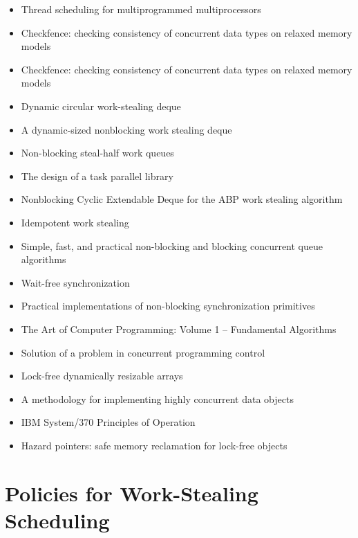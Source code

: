 \begin{itemize}
\item[\checkmark] Thread scheduling for multiprogrammed
  multiprocessors \cite{Arora2001}
\item[\texttimes] Checkfence: checking consistency of concurrent data
  types on relaxed memory models \cite{Burckhardt2007}
\item[\texttimes] Checkfence: checking consistency of concurrent data
  types on relaxed memory models \cite{Burckhardt2007a}
\item[\checkmark] Dynamic circular work-stealing deque
  \cite{Chase2005}
\item[\checkmark] A dynamic-sized nonblocking work stealing deque
  \cite{Hendler2006}
\item[\textbullet] Non-blocking steal-half work queues
  \cite{Hendler2002}
\item[\checkmark] The design of a task parallel library
  \cite{Leijen2009}
\item[\checkmark] Nonblocking Cyclic Extendable Deque for the ABP work
  stealing algorithm \cite{Lev2005}
\item[\checkmark] Idempotent work stealing \cite{Michael2009}
\item[\textbullet] Simple, fast, and practical non-blocking and
  blocking concurrent queue algorithms \cite{Michael1996}
\item[\checkmark] Wait-free synchronization \cite{Herlihy1991}
\item[\checkmark] Practical implementations of non-blocking
  synchronization primitives \cite{Moir1997}
\item[\checkmark] The Art of Computer Programming: Volume 1 --
  Fundamental Algorithms \cite{Knuth1997}
\item[\texttimes] Solution of a problem in concurrent programming
  control \cite{Dijkstra1965}
\item[\texttimes] Lock-free dynamically resizable arrays
  \cite{Dechev2006}
\item[\texttimes] A methodology for implementing highly concurrent
  data objects \cite{Herlihy1993}
\item[\checkmark] IBM System/370 Principles of Operation
  \cite{IBM1974}
\item[\checkmark] Hazard pointers: safe memory reclamation for
  lock-free objects \cite{Michael2004}
\end{itemize}


\section*{Policies for Work-Stealing Scheduling}
\label{sec:lr-policies-for-work-stealing-scheduling}

